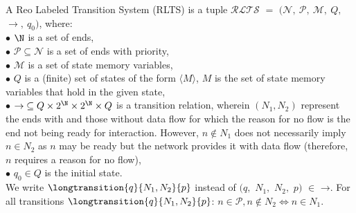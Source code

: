 %
 \begin{definition}
\label{def:rlts}
A Reo Labeled Transition System (RLTS) is a tuple $\mathcal{RLTS}$ $=$ $($$\mathcal{N},\ $$ \mathcal{P},\  \mathcal{M}, 
 \ $$Q,\ $$\rightarrow,$$\ q_0)$, where:\\
%
$\bullet$ $\N$ is a set of ends, \\
$\bullet$  $\mathcal{P} \subseteq \mathcal{N}$ is a set of ends with priority, \\
$\bullet$ $\mathcal{M}$ is a set of state memory variables,\\
%
$\bullet$ $Q$ is a (finite) set of states of the form $\langle M %
\rangle$, $M$ is the set of state memory variables that hold in the given state, \\%
$\bullet$  $\mathord{\rightarrow} \subseteq Q \times 2^{\N} \times 2^{\N}  \times Q$ is a transition relation, wherein $(N_1, N_2)$ represent the ends with and those without data flow for which the reason for no flow is the end not being ready for interaction. However, $n \not \in N_1$ does not necessarily imply $n \in N_2$ as $n$ may be ready but the network provides it with data flow (therefore, $n$ requires a reason for no flow), \\ 
$\bullet$  $q_0 \in Q$ is the initial state.\\

We write $\longtransition{q}{N_1,N_2}{p}$ instead of $(q,$ $N_1,$ $N_2,$ $p)$ $\in$ $\mathord{\rightarrow}$. For all transitions $\longtransition{q}{N_1,N_2}{p}$:
$n \in \mathcal{P}, n \notin N_2 \Leftrightarrow n \in N_1$. 
\end{definition}
